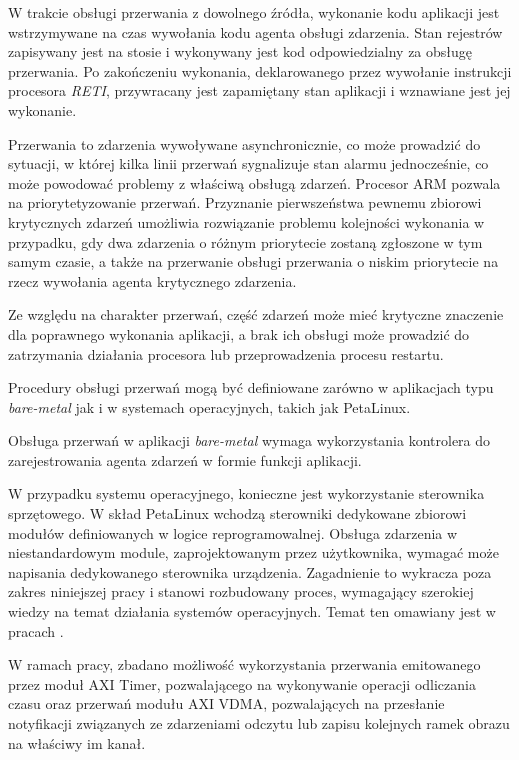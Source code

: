 W trakcie obsługi przerwania z dowolnego źródła, wykonanie kodu aplikacji jest wstrzymywane na czas wywołania kodu agenta obsługi zdarzenia. 
Stan rejestrów zapisywany jest na stosie i wykonywany jest kod odpowiedzialny za obsługę przerwania. 
Po zakończeniu wykonania, deklarowanego przez wywołanie instrukcji procesora \emph{RETI}, przywracany jest zapamiętany stan aplikacji i wznawiane jest jej wykonanie.

Przerwania to zdarzenia wywoływane asynchronicznie, co może prowadzić do sytuacji, w której kilka linii przerwań sygnalizuje stan alarmu jednocześnie, co może powodować problemy z właściwą obsługą zdarzeń. %
Procesor ARM pozwala na priorytetyzowanie przerwań. 
Przyznanie pierwszeństwa pewnemu zbiorowi krytycznych zdarzeń umożliwia rozwiązanie problemu kolejności wykonania w przypadku, gdy dwa zdarzenia o różnym priorytecie zostaną zgłoszone w tym samym czasie, a także na przerwanie obsługi przerwania o niskim priorytecie na rzecz wywołania agenta krytycznego zdarzenia.

Ze względu na charakter przerwań, część zdarzeń może mieć krytyczne znaczenie dla poprawnego wykonania aplikacji, a brak ich obsługi może prowadzić do zatrzymania działania procesora lub przeprowadzenia procesu restartu.

Procedury obsługi przerwań mogą być definiowane zarówno w aplikacjach typu \textit{bare-metal} jak i w systemach operacyjnych, takich jak PetaLinux.

Obsługa przerwań w aplikacji \textit{bare-metal} wymaga wykorzystania kontrolera do zarejestrowania agenta zdarzeń w formie funkcji aplikacji.

W przypadku systemu operacyjnego, konieczne jest wykorzystanie sterownika sprzętowego. 
W skład PetaLinux wchodzą sterowniki dedykowane zbiorowi modułów definiowanych w logice reprogramowalnej. 
Obsługa zdarzenia w niestandardowym module, zaprojektowanym przez użytkownika, wymagać może napisania dedykowanego sterownika urządzenia.
Zagadnienie to wykracza poza zakres niniejszej pracy i stanowi rozbudowany proces, wymagający szerokiej wiedzy na temat działania systemów operacyjnych. 
Temat ten omawiany jest w pracach \cite{Love2014,Corbet2005}.

W ramach pracy, zbadano możliwość wykorzystania przerwania emitowanego przez moduł AXI Timer, pozwalającego na wykonywanie operacji odliczania czasu oraz przerwań modułu AXI VDMA, pozwalających na przesłanie notyfikacji związanych ze zdarzeniami odczytu lub zapisu kolejnych ramek obrazu na właściwy im kanał.

